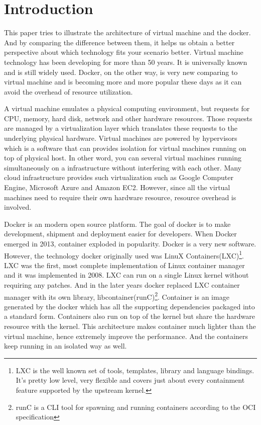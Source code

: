 \documentclass{sig-alternate}
\begin{document}




\section{Introduction}
This paper tries to illustrate the architecture of virtual machine and the docker. And by comparing the difference between them, it helps us obtain a better perspective about which technology fits your scenario better. Virtual machine technology has been developing for more than 50 years. It is universally known and is still widely used. Docker, on the other way, is very new comparing to virtual machine and is becoming more and more popular these days as it can avoid the overhead of resource utilization.

A virtual machine emulates a physical computing environment, but requests for CPU, memory, hard disk, network and other hardware resources. Those requests are managed by a virtualization layer which translates these requests to the underlying physical hardware. Virtual machines are powered by hypervisors which is a software that can provides isolation for virtual machines running on top of physical host. In other word, you can several virtual machines running simultaneously on a infrastructure without interfering with each other. Many cloud infrastructure provides such virtualization such as Google Computer Engine, Microsoft Azure and Amazon EC2. However, since all the virtual machines need to require their own hardware resource, resource overhead is involved. 

Docker is an modern open source platform. The goal of docker is to make development, shipment and deployment easier for developers. When Docker emerged in 2013, container exploded in popularity. Docker is a very new software. However, the technology docker originally used was LinuX Containers(LXC)\footnote{LXC is the well known set of tools, templates, library and language bindings. It's pretty low level, very flexible and covers just about every containment feature supported by the upstream kernel.}. LXC was the first, most complete implementation of Linux container manager and it was implemented in 2008. LXC can run on a single Linux kernel without requiring any patches. And in the later years docker replaced LXC container manager with its own library, libcontainer(runC)\footnote{runC is a CLI tool for spawning and running containers according to the OCI specification}. Container is an image generated by the docker which has all the supporting dependencies packaged into a standard form. Containers also run on top of the kernel but share the hardware resource with the kernel. This architecture makes container much lighter than the virtual machine, hence extremely improve the performance. And the containers keep running in an isolated way as well.
\end{document}
